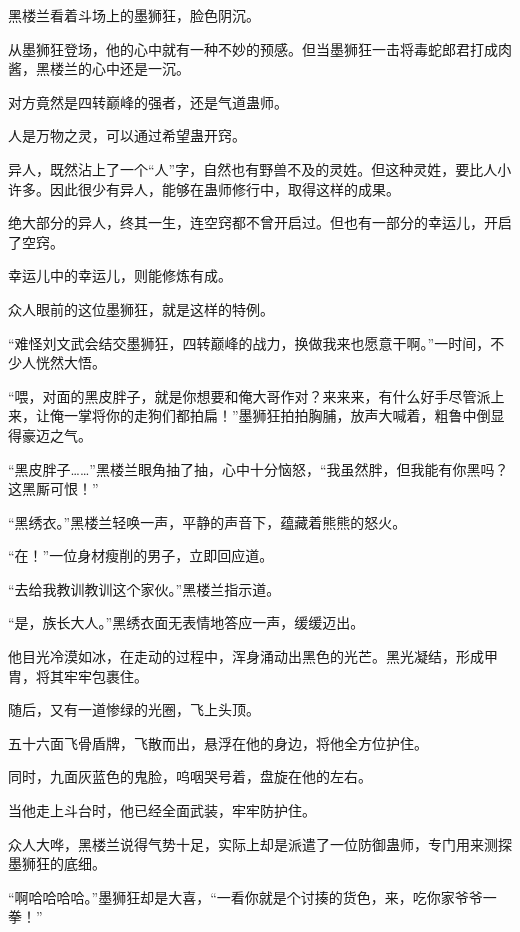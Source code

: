 
\begin{this_body}



黑楼兰看着斗场上的墨狮狂，脸色阴沉。

从墨狮狂登场，他的心中就有一种不妙的预感。但当墨狮狂一击将毒蛇郎君打成肉酱，黑楼兰的心中还是一沉。

对方竟然是四转巅峰的强者，还是气道蛊师。

人是万物之灵，可以通过希望蛊开窍。

异人，既然沾上了一个“人”字，自然也有野兽不及的灵姓。但这种灵姓，要比人小许多。因此很少有异人，能够在蛊师修行中，取得这样的成果。

绝大部分的异人，终其一生，连空窍都不曾开启过。但也有一部分的幸运儿，开启了空窍。

幸运儿中的幸运儿，则能修炼有成。

众人眼前的这位墨狮狂，就是这样的特例。

“难怪刘文武会结交墨狮狂，四转巅峰的战力，换做我来也愿意干啊。”一时间，不少人恍然大悟。

“喂，对面的黑皮胖子，就是你想要和俺大哥作对？来来来，有什么好手尽管派上来，让俺一掌将你的走狗们都拍扁！”墨狮狂拍拍胸脯，放声大喊着，粗鲁中倒显得豪迈之气。

“黑皮胖子……”黑楼兰眼角抽了抽，心中十分恼怒，“我虽然胖，但我能有你黑吗？这黑厮可恨！”

“黑绣衣。”黑楼兰轻唤一声，平静的声音下，蕴藏着熊熊的怒火。

“在！”一位身材瘦削的男子，立即回应道。

“去给我教训教训这个家伙。”黑楼兰指示道。

“是，族长大人。”黑绣衣面无表情地答应一声，缓缓迈出。

他目光冷漠如冰，在走动的过程中，浑身涌动出黑色的光芒。黑光凝结，形成甲胄，将其牢牢包裹住。

随后，又有一道惨绿的光圈，飞上头顶。

五十六面飞骨盾牌，飞散而出，悬浮在他的身边，将他全方位护住。

同时，九面灰蓝色的鬼脸，呜咽哭号着，盘旋在他的左右。

当他走上斗台时，他已经全面武装，牢牢防护住。

众人大哗，黑楼兰说得气势十足，实际上却是派遣了一位防御蛊师，专门用来测探墨狮狂的底细。

“啊哈哈哈哈。”墨狮狂却是大喜，“一看你就是个讨揍的货色，来，吃你家爷爷一拳！”


\end{this_body}
